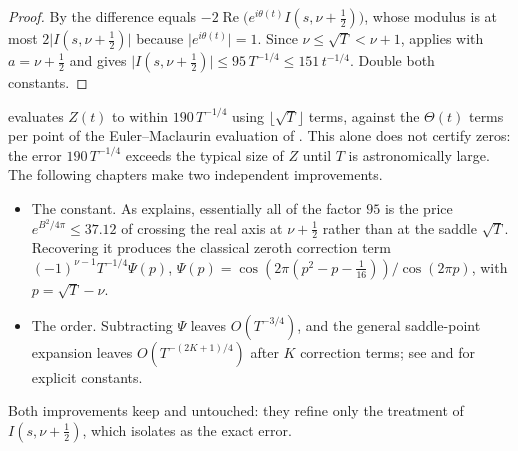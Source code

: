 \begin{proof}
\leanok
By  the difference equals
$-2\operatorname{Re}\bigl(e^{i\theta(t)}I(s,\nu+\tfrac12)\bigr)$, whose modulus is at most
$2\lvert I(s,\nu+\tfrac12)\rvert$ because $\lvert e^{i\theta(t)}\rvert=1$.  Since
$\nu\le\sqrt T<\nu+1$,  applies with $a=\nu+\tfrac12$ and
gives $\lvert I(s,\nu+\tfrac12)\rvert\le95\,T^{-1/4}\le151\,t^{-1/4}$.  Double both
constants.
\end{proof}

\begin{remark}
\label{rem:rsz_next}
 evaluates $Z(t)$ to within $190\,T^{-1/4}$ using
$\lfloor\sqrt{T}\rfloor$ terms, against the $\Theta(t)$ terms per point of the
Euler--Maclaurin evaluation of .  This alone does not certify zeros: the
error $190\,T^{-1/4}$ exceeds the typical size of $Z$ until $T$ is astronomically large.  The
following chapters make two independent improvements.
\begin{itemize}
  \item The constant.  As  explains, essentially all of the factor
        $95$ is the price $e^{B^{2}/4\pi}\le37.12$ of crossing the real axis at
        $\nu+\tfrac12$ rather than at the saddle $\sqrt T$.  Recovering it produces the
        classical zeroth correction term
        $(-1)^{\nu-1}T^{-1/4}\Psi(p)$, $\Psi(p)=\cos(2\pi(p^{2}-p-\tfrac1{16}))/\cos(2\pi p)$,
        with $p=\sqrt T-\nu$.
  \item The order.  Subtracting $\Psi$ leaves $O(T^{-3/4})$, and the general saddle-point
        expansion leaves $O(T^{-(2K+1)/4})$ after $K$ correction terms; see
        \cite{Gabcke} and \cite{AriasDeReyna2011} for explicit constants.
\end{itemize}
Both improvements keep  and  untouched: they
refine only the treatment of $I(s,\nu+\tfrac12)$, which  isolates as
the exact error.
\end{remark}
